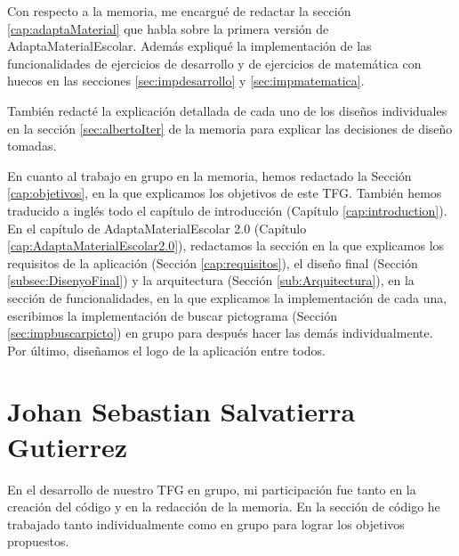Con respecto a la memoria, me encargué de redactar la sección \ref{cap:adaptaMaterial} que habla sobre la primera versión de AdaptaMaterialEscolar. Además expliqué la implementación de las funcionalidades de ejercicios de desarrollo y de ejercicios de matemática con huecos en las secciones \ref{sec:impdesarrollo} y \ref{sec:impmatematica}.

También redacté la explicación detallada de cada uno de los diseños individuales en la sección \ref{sec:albertoIter} de la memoria para explicar las decisiones de diseño tomadas.

En cuanto al trabajo en grupo en la memoria, hemos redactado la Sección \ref{cap:objetivos}, en la que explicamos los objetivos de este TFG. También hemos traducido a inglés todo el capítulo de introducción (Capítulo \ref{cap:introduction}). En el capítulo de AdaptaMaterialEscolar 2.0 (Capítulo \ref{cap:AdaptaMaterialEscolar2.0}), redactamos la sección en la que explicamos los requisitos de la aplicación (Sección \ref{cap:requisitos}), el diseño final (Sección \ref{subsec:DisenyoFinal}) y la arquitectura (Sección \ref{sub:Arquitectura}), en la sección de funcionalidades, en la que explicamos la implementación de cada una, escribimos la implementación de buscar pictograma (Sección \ref{sec:impbuscarpicto}) en grupo para después hacer las demás individualmente. Por último, diseñamos el logo de la aplicación entre todos.


\section{Johan Sebastian Salvatierra Gutierrez}
En el desarrollo de nuestro TFG en grupo, mi participación fue tanto en la creación del código y en la redacción de la memoria. En la sección de código he trabajado tanto individualmente como en grupo para lograr los objetivos propuestos.


